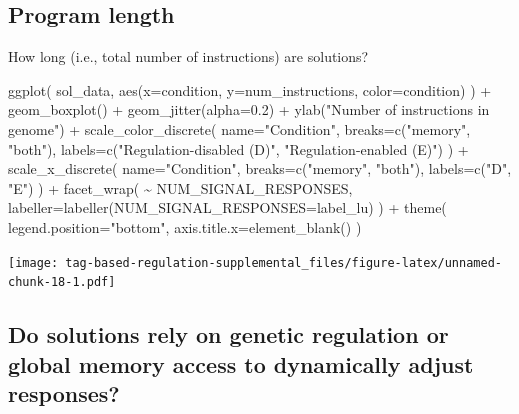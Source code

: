 \documentclass[
]{book}
\newenvironment{Shaded}{\begin{snugshade}}{\end{snugshade}}
\newcommand{\AttributeTok}[1]{\textcolor[rgb]{0.77,0.63,0.00}{#1}}
\newcommand{\FloatTok}[1]{\textcolor[rgb]{0.00,0.00,0.81}{#1}}
\newcommand{\FunctionTok}[1]{\textcolor[rgb]{0.00,0.00,0.00}{#1}}
\newcommand{\NormalTok}[1]{#1}
\newcommand{\SpecialCharTok}[1]{\textcolor[rgb]{0.00,0.00,0.00}{#1}}
\newcommand{\StringTok}[1]{\textcolor[rgb]{0.31,0.60,0.02}{#1}}
\begin{document}
\hypertarget{program-length}{%
\subsection{Program length}\label{program-length}}

How long (i.e., total number of instructions) are solutions?

\begin{Shaded}
\begin{Highlighting}[]
\FunctionTok{ggplot}\NormalTok{( sol\_data, }\FunctionTok{aes}\NormalTok{(}\AttributeTok{x=}\NormalTok{condition, }\AttributeTok{y=}\NormalTok{num\_instructions, }\AttributeTok{color=}\NormalTok{condition) ) }\SpecialCharTok{+}
  \FunctionTok{geom\_boxplot}\NormalTok{() }\SpecialCharTok{+}
  \FunctionTok{geom\_jitter}\NormalTok{(}\AttributeTok{alpha=}\FloatTok{0.2}\NormalTok{) }\SpecialCharTok{+}
  \FunctionTok{ylab}\NormalTok{(}\StringTok{"Number of instructions in genome"}\NormalTok{) }\SpecialCharTok{+}
  \FunctionTok{scale\_color\_discrete}\NormalTok{(}
    \AttributeTok{name=}\StringTok{"Condition"}\NormalTok{,}
    \AttributeTok{breaks=}\FunctionTok{c}\NormalTok{(}\StringTok{"memory"}\NormalTok{, }\StringTok{"both"}\NormalTok{),}
    \AttributeTok{labels=}\FunctionTok{c}\NormalTok{(}\StringTok{"Regulation{-}disabled (D)"}\NormalTok{, }\StringTok{"Regulation{-}enabled (E)"}\NormalTok{)}
\NormalTok{  ) }\SpecialCharTok{+}
  \FunctionTok{scale\_x\_discrete}\NormalTok{(}
    \AttributeTok{name=}\StringTok{"Condition"}\NormalTok{,}
    \AttributeTok{breaks=}\FunctionTok{c}\NormalTok{(}\StringTok{"memory"}\NormalTok{, }\StringTok{"both"}\NormalTok{),}
    \AttributeTok{labels=}\FunctionTok{c}\NormalTok{(}\StringTok{"D"}\NormalTok{, }\StringTok{"E"}\NormalTok{)}
\NormalTok{  ) }\SpecialCharTok{+}
  \FunctionTok{facet\_wrap}\NormalTok{(}
    \SpecialCharTok{\textasciitilde{}}\NormalTok{ NUM\_SIGNAL\_RESPONSES,}
    \AttributeTok{labeller=}\FunctionTok{labeller}\NormalTok{(}\AttributeTok{NUM\_SIGNAL\_RESPONSES=}\NormalTok{label\_lu)}
\NormalTok{  ) }\SpecialCharTok{+}
  \FunctionTok{theme}\NormalTok{(}
    \AttributeTok{legend.position=}\StringTok{"bottom"}\NormalTok{,}
    \AttributeTok{axis.title.x=}\FunctionTok{element\_blank}\NormalTok{()}
\NormalTok{  )}
\end{Highlighting}
\end{Shaded}

\texttt{[image: tag-based-regulation-supplemental\_files/figure-latex/unnamed-chunk-18-1.pdf]}

\hypertarget{do-solutions-rely-on-genetic-regulation-or-global-memory-access-to-dynamically-adjust-responses}{%
\subsection{Do solutions rely on genetic regulation or global memory access to dynamically adjust responses?}\label{do-solutions-rely-on-genetic-regulation-or-global-memory-access-to-dynamically-adjust-responses}}
\end{document}

